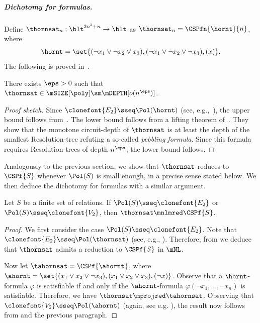 \documentclass[11pt]{article}
\begin{document}
\subparagraph{Dichotomy for formulas.}


Define $\thornsat_n : \blt^{2n^3+n} \to \blt$ 
as $\thornsat_n = \CSPfn{\hornt}{n}$, where
$$
\hornt = \set{
    (\neg x_1 \lor \neg x_2 \lor x_3),
    (\neg x_1 \lor \neg x_2 \lor \neg x_3),
    (x)
}.$$
The following is proved 
in~\cite{DBLP:journals/combinatorica/RazM99, gkrs19}.


\begin{theorem}
    \label{thm:3hornsat_lb}
    There exists $\eps > 0$
    such that
    $\thornsat \in \mSIZE[\poly] \sm \mDEPTH[o(n^\eps)]$.
\end{theorem}
\begin{proof}[Proof sketch]
    Since $\clonefont{E_2} \sseq \Pol(\hornt)$ (see,
    e.g.,~\cite[Lemma 4.8]{DBLP:books/daglib/0004131}),
    the upper bound follows from~.
    The lower bound follows from a lifting theorem
    of~\cite{DBLP:journals/combinatorica/RazM99,gkrs19}.
    They show that 
    the monotone circuit-depth of $\thornsat$
    is at least the
    depth of the smallest Resolution-tree
    refuting a so-called \emph{pebbling formula}.
    Since this formula requires Resolution-trees of depth $n^\eps$,
    the lower bound follows.
\end{proof}

Analogously to the previous section, we show that $\thornsat$ reduces
to $\CSPf{S}$ whenever
$\Pol(S)$ is small enough, in 
a precise sense stated below.
We then deduce the dichotomy for formulas with a similar argument.

\begin{lemma}
    \label{lem:l3_hornsat}
    Let $S$ be a finite set of relations.
    If 
    $\Pol(S) \sseq \clonefont{E_2}$ or $\Pol(S) \sseq \clonefont{V_2}$,
    then
    $\thornsat \mnlmred \CSPf{S}$.
\end{lemma}
\begin{proof}
    We first consider the case $\Pol(S) \sseq \clonefont{E_2}$.
    Note that
    $\clonefont{E_2} \sseq \Pol(\thornsat)$
    (see, e.g., \cite[Lemma 4.8]{DBLP:books/daglib/0004131}).
    Therefore, from  we deduce
    that $\thornsat$ admits a reduction to
    $\CSPf{S}$ in $\mNL$.

    Now let
    $\tahornsat = \CSPf{\ahornt}$,
    where
    $\ahornt = 
    \set{
        (x_1 \lor x_2 \lor \neg x_3),
        (x_1 \lor x_2 \lor x_3),
        (\neg x)
    }$.
    Observe that a
    $\hornt$-formula $\varphi$
    is satisfiable if and only if
    the $\ahornt$-formula 
    $\varphi(\neg x_1,\dots,\neg x_n)$
    is satisfiable.
    Therefore, we have
    $\thornsat \mprojred \tahornsat$.
    Observing that
    $\clonefont{V_2} \sseq \Pol(\ahornt)$
    (again, see e.g. \cite[Lemma 4.8]{DBLP:books/daglib/0004131}),
    the result now follows from
     and the previous paragraph.
\end{proof}
\end{document}
